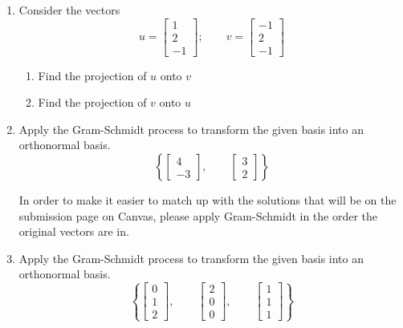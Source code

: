 \documentclass[reqno]{amsart}
\theoremstyle{definition}
\begin{document}
\begin{enumerate}

\item  Consider the vectors
%
\begin{equation*}
u = \begin{bmatrix}
1\\
2\\
-1
\end{bmatrix};\qquad
v = \begin{bmatrix}
-1\\
2\\
-1
\end{bmatrix}
\end{equation*}

\begin{enumerate}

\item  Find the projection of $u$ onto $v$

\item  Find the projection of $v$ onto $u$

\end{enumerate}

\item  Apply the Gram-Schmidt process to transform the given basis into an orthonormal basis.
%
\begin{equation*}
\left\lbrace\begin{bmatrix}
4\\
-3
\end{bmatrix},\qquad
\begin{bmatrix}
3\\
2
\end{bmatrix}\right\rbrace
\end{equation*}

In order to make it easier to match up with the solutions that will be on the submission page on Canvas, please apply Gram-Schmidt in the order the original vectors are in.

\item  Apply the Gram-Schmidt process to transform the given basis into an orthonormal basis.
%
\begin{equation*}
\left\lbrace\begin{bmatrix}
0\\
1\\
2
\end{bmatrix},\qquad
\begin{bmatrix}
2\\
0\\
0
\end{bmatrix},\qquad
\begin{bmatrix}
1\\
1\\
1
\end{bmatrix}\right\rbrace
\end{equation*}


\end{enumerate}
\end{document}
